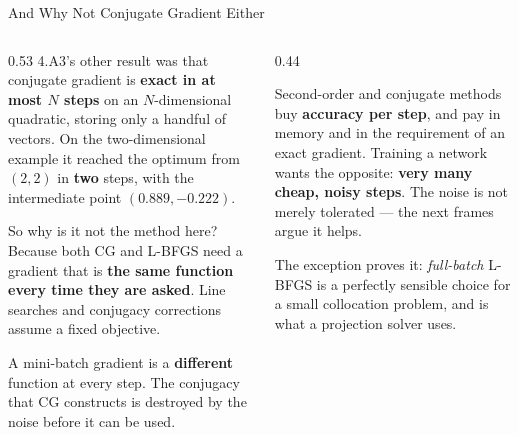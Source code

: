 \begin{frame}{And Why Not Conjugate Gradient Either}
\begin{columns}[T]
\begin{column}{0.53\textwidth}
\small
4.A3's other result was that conjugate gradient is \textbf{exact in at most $N$ steps} on an $N$-dimensional quadratic, storing only a handful of vectors. On the two-dimensional example it reached the optimum from $(2,2)$ in \textbf{two} steps, with the intermediate point $(0.889,-0.222)$.
\medskip

So why is it not the method here? Because both CG and L-BFGS need a gradient that is \textbf{the same function every time they are asked}. Line searches and conjugacy corrections assume a fixed objective.
\medskip

A mini-batch gradient is a \textbf{different} function at every step. The conjugacy that CG constructs is destroyed by the noise before it can be used.
\end{column}
\begin{column}{0.44\textwidth}
\begin{takeawaybox}[title=\textbf{The trade, stated once}]\small
Second-order and conjugate methods buy \textbf{accuracy per step}, and pay in memory and in the requirement of an exact gradient.
\medskip
Training a network wants the opposite: \textbf{very many cheap, noisy steps}. The noise is not merely tolerated --- the next frames argue it helps.
\end{takeawaybox}
\medskip
\begin{examplebox}\footnotesize
The exception proves it: \emph{full-batch} L-BFGS is a perfectly sensible choice for a small collocation problem, and is what a projection solver uses.
\end{examplebox}
\end{column}
\end{columns}
\vspace{1mm}
\end{frame}

